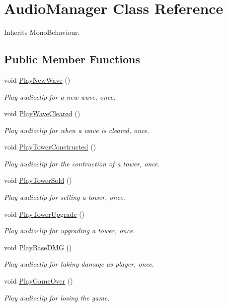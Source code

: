 \hypertarget{class_audio_manager}{}\section{Audio\+Manager Class Reference}
\label{class_audio_manager}


Inherits Mono\+Behaviour.

\subsection*{Public Member Functions}
\begin{DoxyCompactItemize}
\item 
void \hyperlink{class_audio_manager_a5c18ad9c5effc65e1a88596701c757c8}{Play\+New\+Wave} ()
\begin{DoxyCompactList}\small\item\em Play audioclip for a new wave, once. \end{DoxyCompactList}\item 
void \hyperlink{class_audio_manager_a80732f860b70c5a722a76800acc0a8ea}{Play\+Wave\+Cleared} ()
\begin{DoxyCompactList}\small\item\em Play audioclip for when a wave is cleared, once. \end{DoxyCompactList}\item 
void \hyperlink{class_audio_manager_aa6b0488b1abfad2ad65ecb07fc1cbfe3}{Play\+Tower\+Constructed} ()
\begin{DoxyCompactList}\small\item\em Play audioclip for the contruction of a tower, once. \end{DoxyCompactList}\item 
void \hyperlink{class_audio_manager_a42b6d3a92acb7ae3555ab61dcf8361fb}{Play\+Tower\+Sold} ()
\begin{DoxyCompactList}\small\item\em Play audioclip for selling a tower, once. \end{DoxyCompactList}\item 
void \hyperlink{class_audio_manager_a642bbd044186fd4b1dc629945fb062b9}{Play\+Tower\+Upgrade} ()
\begin{DoxyCompactList}\small\item\em Play audioclip for upgrading a tower, once. \end{DoxyCompactList}\item 
void \hyperlink{class_audio_manager_a92144340e49258c8d647b073d679a817}{Play\+Base\+D\+MG} ()
\begin{DoxyCompactList}\small\item\em Play audioclip for taking damage as player, once. \end{DoxyCompactList}\item 
void \hyperlink{class_audio_manager_af22f9f4ba3c5eb4d07ab6f5460fded05}{Play\+Game\+Over} ()
\begin{DoxyCompactList}\small\item\em Play audioclip for losing the game. \end{DoxyCompactList}\end{DoxyCompactItemize}
